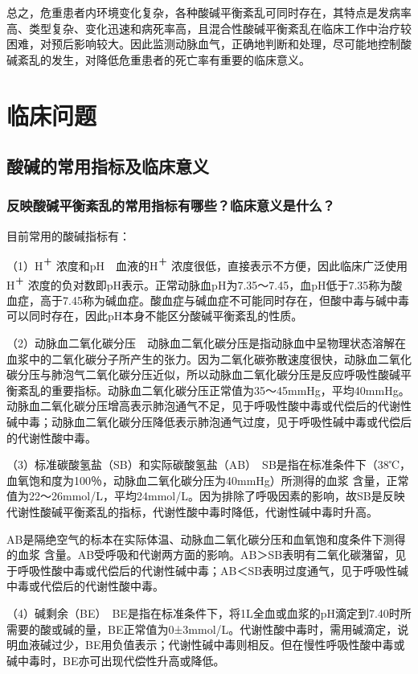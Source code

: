总之，危重患者内环境变化复杂，各种酸碱平衡紊乱可同时存在，其特点是发病率高、类型复杂、变化迅速和病死率高，且混合性酸碱平衡紊乱在临床工作中治疗较困难，对预后影响较大。因此监测动脉血气，正确地判断和处理，尽可能地控制酸碱紊乱的发生，对降低危重患者的死亡率有重要的临床意义。

\section{临床问题}

\subsection{酸碱的常用指标及临床意义}

\subsubsection{反映酸碱平衡紊乱的常用指标有哪些？临床意义是什么？}

目前常用的酸碱指标有：

（1）H\textsuperscript{＋} 浓度和pH　血液的H\textsuperscript{＋}
浓度很低，直接表示不方便，因此临床广泛使用H\textsuperscript{＋}
浓度的负对数即pH表示。正常动脉血pH为7.35～7.45，血pH低于7.35称为酸血症，高于7.45称为碱血症。酸血症与碱血症不可能同时存在，但酸中毒与碱中毒可以同时存在，因此pH本身不能区分酸碱平衡紊乱的性质。

（2）动脉血二氧化碳分压　动脉血二氧化碳分压是指动脉血中呈物理状态溶解在血浆中的二氧化碳分子所产生的张力。因为二氧化碳弥散速度很快，动脉血二氧化碳分压与肺泡气二氧化碳分压近似，所以动脉血二氧化碳分压是反应呼吸性酸碱平衡紊乱的重要指标。动脉血二氧化碳分压正常值为35～45mmHg，平均40mmHg。动脉血二氧化碳分压增高表示肺泡通气不足，见于呼吸性酸中毒或代偿后的代谢性碱中毒；动脉血二氧化碳分压降低表示肺泡通气过度，见于呼吸性碱中毒或代偿后的代谢性酸中毒。

（3）标准碳酸氢盐（SB）和实际碳酸氢盐（AB）　SB是指在标准条件下（38℃，血氧饱和度为100％，动脉血二氧化碳分压为40mmHg）所测得的血浆
含量，正常值为22～26mmol/L，平均24mmol/L。因为排除了呼吸因素的影响，故SB是反映代谢性酸碱平衡紊乱的指标，代谢性酸中毒时降低，代谢性碱中毒时升高。

AB是隔绝空气的标本在实际体温、动脉血二氧化碳分压和血氧饱和度条件下测得的血浆
含量。AB受呼吸和代谢两方面的影响。AB＞SB表明有二氧化碳潴留，见于呼吸性酸中毒或代偿后的代谢性碱中毒；AB＜SB表明过度通气，见于呼吸性碱中毒或代偿后的代谢性酸中毒。

（4）碱剩余（BE）　BE是指在标准条件下，将1L全血或血浆的pH滴定到7.40时所需要的酸或碱的量，BE正常值为0±3mmol/L。代谢性酸中毒时，需用碱滴定，说明血液碱过少，BE用负值表示；代谢性碱中毒则相反。但在慢性呼吸性酸中毒或碱中毒时，BE亦可出现代偿性升高或降低。

